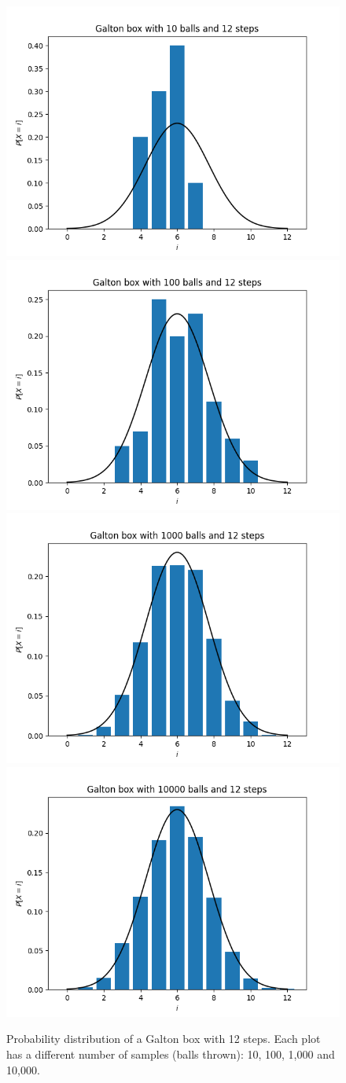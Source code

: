 \documentclass{article}
\begin{document}
\begin{figure}
    \centering
    \includegraphics[width=0.48\linewidth]{plots/12-10-a.png}
    \includegraphics[width=0.48\linewidth]{plots/12-100-a.png}
    \includegraphics[width=0.48\linewidth]{plots/12-1000-a.png}
    \includegraphics[width=0.48\linewidth]{plots/12-10000-a.png}
    \caption{Probability distribution of a Galton box with 12 steps. Each plot has a different number of samples (balls thrown): 10, 100, 1,000 and 10,000.}
    \label{fig:12-steps}
\end{figure}
\end{document}
